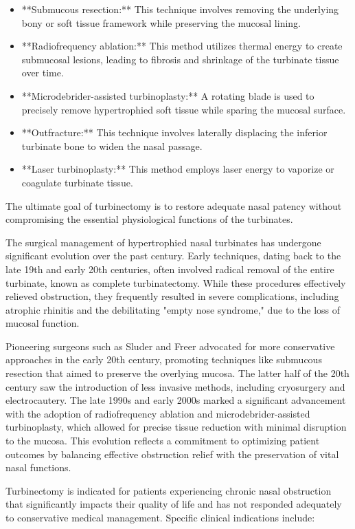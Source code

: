 \begin{itemize}
  \item **Submucous resection:** This technique involves removing the underlying bony or soft tissue framework while preserving the mucosal lining.
  \item **Radiofrequency ablation:** This method utilizes thermal energy to create submucosal lesions, leading to fibrosis and shrinkage of the turbinate tissue over time.
  \item **Microdebrider-assisted turbinoplasty:** A rotating blade is used to precisely remove hypertrophied soft tissue while sparing the mucosal surface.
  \item **Outfracture:** This technique involves laterally displacing the inferior turbinate bone to widen the nasal passage.
  \item **Laser turbinoplasty:** This method employs laser energy to vaporize or coagulate turbinate tissue.
\end{itemize}

The ultimate goal of turbinectomy is to restore adequate nasal patency without compromising the essential physiological functions of the turbinates.

The surgical management of hypertrophied nasal turbinates has undergone significant evolution over the past century. Early techniques, dating back to the late 19th and early 20th centuries, often involved radical removal of the entire turbinate, known as complete turbinatectomy. While these procedures effectively relieved obstruction, they frequently resulted in severe complications, including atrophic rhinitis and the debilitating "empty nose syndrome," due to the loss of mucosal function.

Pioneering surgeons such as Sluder and Freer advocated for more conservative approaches in the early 20th century, promoting techniques like submucous resection that aimed to preserve the overlying mucosa. The latter half of the 20th century saw the introduction of less invasive methods, including cryosurgery and electrocautery. The late 1990s and early 2000s marked a significant advancement with the adoption of radiofrequency ablation and microdebrider-assisted turbinoplasty, which allowed for precise tissue reduction with minimal disruption to the mucosa. This evolution reflects a commitment to optimizing patient outcomes by balancing effective obstruction relief with the preservation of vital nasal functions.

Turbinectomy is indicated for patients experiencing chronic nasal obstruction that significantly impacts their quality of life and has not responded adequately to conservative medical management. Specific clinical indications include:

